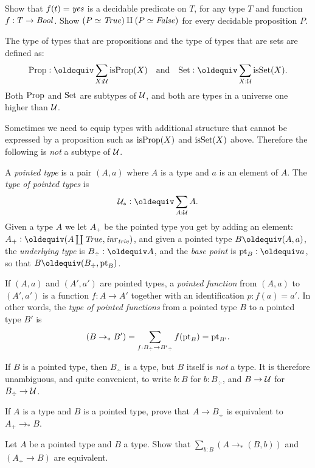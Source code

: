 \begin{xca}\label{xca:decidability}
Show that $f(t)=\mathop{\mathit{yes}}$ is a decidable predicate on $T$,
for any type $T$ and function $f:T\to\mathop{\mathit{Bool}}$.
Show $(P\simeq\mathop{\mathit{True}})\amalg(P\simeq\mathop{\mathit{False}})$ for every decidable
proposition $P$. 
\end{xca}

\begin{definition}\label{def:Prop-Set}
The type of types that are propositions and the 
type of types that are sets are defined as:
\[\Prop\defeq \sum_{X:\UU}\isprop(X)\quad
\text{and}\quad\Set\defeq \sum_{X:\UU}\isset(X).\]
Both $\mathord{\mathrm{Prop}}$ and $\mathord{\mathrm{Set}}$ are subtypes of $\mathcal{U}$, and
both are types in a universe one higher than $\mathcal{U}$. 
\end{definition}

Sometimes we need to equip types with additional structure
that cannot be expressed by a proposition such as
$\mathrm{isProp}(X)$ and $\mathrm{isSet}(X)$ above. 
Therefore the following is \emph{not} a subtype of $\mathcal{U}$.

\begin{definition}\label{def:pointedtypes}
 A \emph{pointed type} is a pair $(A,a)$ where $A$ is a type
 and $a$ is an element of $A$. The \emph{type of pointed types} is
\[\UUp \defeq \sum_{A:\UU} A.\]
Given a type $A$ we let $A_+$ be the pointed type you get 
by adding an element: $A_+\defequi(A\coprod\true,\inr{\triv})$, 
and given a pointed type $B\jdeq(A,a)$, the \emph{underlying type} 
is $B_\div\defeq A$, and the \emph{base point} is $\pt_B\defeq a$, 
so that $B\jdeq (B_\div,\pt_B)$.  

If $(A,a)$ and $(A',a')$ are pointed types, 
a \emph{pointed function} from  $(A,a)$ to $(A',a')$ is 
a function $f:A\to A'$ together with an identification $p:f(a)=a'$. 
In other words, the \emph{type of pointed functions} from a pointed 
type $B$ to a pointed type $B'$ is
\[(B\to_*B')=\sum_{f:B_\div\to B'{}_\div}f({\mathord{\mathrm{pt}}}_B)={\mathord{\mathrm{pt}}}_{B'}.\]
\end{definition}

If $B$ is a pointed type, then $B_\div $ is a type, but $B$ itself is
\emph{not} a type. It is therefore unambiguous, and quite convenient,
to write $b:B$ for $b:B_\div$, and $B\to\mathcal{U}$ for $B_\div\to\mathcal{U}$.

\begin{xca}\label{xca:plusforgetadjoint}
If $A$ is a type and $B$ is a pointed type, 
prove that $A\to B_\div$ is equivalent to $A_+\to_*B$.
\end{xca}

\begin{xca}\label{xca:freemaps}
  Let $A$ be a pointed type and $B$ a type.  Show that  
$\sum_{b:B}(A\to_*(B,b))$ and $(A_\div\to B)$ are equivalent.
\end{xca}


